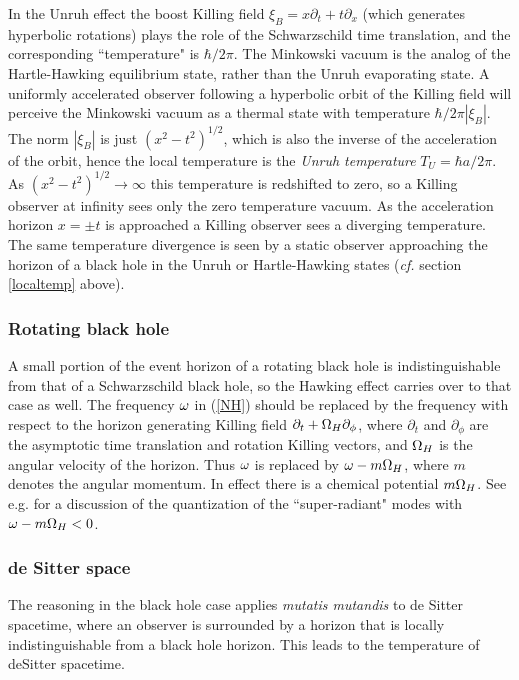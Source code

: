 \documentclass[12pt]{article}
\begin{document}
In the Unruh effect
the boost Killing field $\xi_B=x\partial_t+t\partial_x$ 
(which generates hyperbolic rotations) plays the role of 
the Schwarzschild time translation, 
and the corresponding ``temperature" is $\hbar/2\pi$. 
The Minkowski vacuum is the 
analog of the Hartle-Hawking equilibrium state, rather than
the Unruh evaporating state. 
A uniformly accelerated observer following
a hyperbolic orbit of the Killing field will perceive the 
Minkowski vacuum
as a thermal state with temperature $\hbar/2\pi|\xi_B|$.
The norm $|\xi_B|$ is just $(x^2-t^2)^{1/2}$, which is also
the inverse of the acceleration of the orbit, hence the local
temperature is the {\it Unruh temperature} $T_U=\hbar a/2\pi$.
As $(x^2-t^2)^{1/2}\rightarrow\infty$ this temperature is redshifted to zero,
so a Killing observer at infinity sees only the zero temperature
vacuum. As the acceleration horizon $x=\pm t$ is approached
a Killing observer sees a diverging temperature. The
same temperature divergence is seen by a static observer
approaching the horizon of a black hole in the Unruh or 
Hartle-Hawking states ({\it cf.} section \ref{localtemp} above).

\subsubsection{Rotating black hole}

A small portion of the event horizon of a rotating black hole
is indistinguishable from that of a Schwarzschild black hole,
so the Hawking effect carries over to that case as well.
The frequency $\omega$ in (\ref{NH})
should be replaced by the frequency with 
respect to the horizon generating Killing field $\partial_t +\Omega_H
\partial_\phi$, where $\partial_t$ and $\partial_\phi$ are the asymptotic time translation 
and rotation Killing vectors, and $\Omega_H$ is the angular velocity of the horizon. Thus $\omega$ is replaced by $\omega -m\Omega_H$, where $m$ denotes
the angular momentum. In effect there is a chemical potential
$m\Omega_H$. See  e.g. \cite{Frolov:jh} for a discussion of the
quantization of the ``super-radiant" modes with $\omega -m\Omega_H<0$.


\subsubsection{de Sitter space}

The reasoning in the black hole case applies {\it mutatis mutandis}
to de Sitter spacetime, where an observer is surrounded by a 
horizon that is locally indistinguishable from a black hole horizon.
This leads to the temperature of deSitter spacetime\cite{GH,AndydS}.
\end{document}
